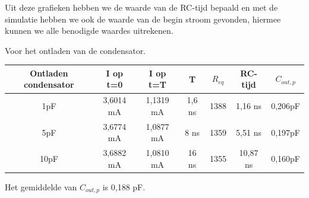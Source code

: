 \documentclass{article}
\begin{document}
Uit deze grafieken hebben we de waarde van de RC-tijd bepaald en met de simulatie hebben we ook de waarde van de begin stroom gevonden, hiermee kunnen we alle benodigde waardes uitrekenen.


\begin{center}

Voor het ontladen van de condensator.

\begin{tabular}{|c |c |c | c| c|c |c|}
	\hline
Ontladen condensator	& I op t=0	& I op t=T 	&  T 		& $R_{eq}$		&RC-tijd 	& $C_{out,p}$ \\
	\hline
1pF 				& 3,6014 mA	& 1,1319 mA	& 1,6 ns	& 1388\Omega	& 1,16 ns	& 0,206pF \\
	\hline
5pF				& 3,6774 mA	& 1,0877 mA	& 8 ns 	& 1359\Omega	& 5,51 ns	& 0,197pF  \\
	\hline
10pF				& 3,6882 mA	& 1,0810 mA	& 16 ns	& 1355\Omega	& 10,87 ns	& 0,160pF \\
	\hline

\end{tabular}
\end{center}

Het gemiddelde van $C_{out,p}$ is 0,188 pF.
\end{document}
